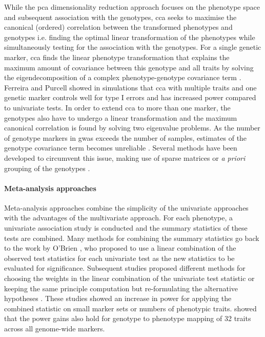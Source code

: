 While the \gls{pca}  dimensionality reduction approach focuses on the phenotype space and subsequent association with the genotypes, \gls{cca}   seeks to maximise the canonical (ordered) correlation between the transformed phenotypes and genotypes i.e. finding the optimal linear transformation of the phenotypes while simultaneously testing for the association with the genotypes.  For a single genetic marker, \gls{cca}  finds the linear phenotype transformation that explains the maximum amount of covariance between this genotype and all traits by solving the eigendecomposition of a complex phenotype-genotype covariance term \citep{Yang2012}. Ferreira and Purcell \parencite*{Ferreira2009} showed in simulations that \gls{cca}  with multiple traits and one genetic marker controls well for type I errors and has increased power compared to univariate tests. In order to extend \gls{cca}  to more than one marker, the genotypes also have to undergo a linear transformation and the maximum canonical correlation is found by solving two eigenvalue problems. As the number of genotype markers in \gls{gwas}  exceeds the number of samples, estimates of the genotype covariance term becomes unreliable \citep{Schaefer2005}. Several methods have been developed to circumvent this issue, making use of sparse matrices \citep{Parkhomenko2009} or \textit{a priori} grouping of the genotypes \citep{Naylor2010}. 

\paragraph{Meta-analysis approaches} Meta-analysis approaches combine the simplicity of the univariate approaches with the advantages of the multivariate approach. For each phenotype, a univariate association study is conducted and the summary statistics of these tests are combined. Many methods for combining the summary statistics \citep{Xu2003,Yang2010,Bolormaa2014} go back to the work by O'Brien \citep{OBrien1984}, who proposed to use a linear combination of the observed test statistics for each univariate test as the new statistics to be evaluated for significance. Subsequent studies proposed different methods for choosing the weights in the linear combination of the univariate test statistic or keeping the same principle computation but re-formulating the alternative hypotheses \citep{Yang2010,Xu2003}. These studies showed an increase in power for applying the combined statistic on small marker sets or numbers of phenotypic traits. \citet{Bolormaa2014} showed that the power gains also hold for genotype to phenotype mapping of 32 traits across all genome-wide markers. 

